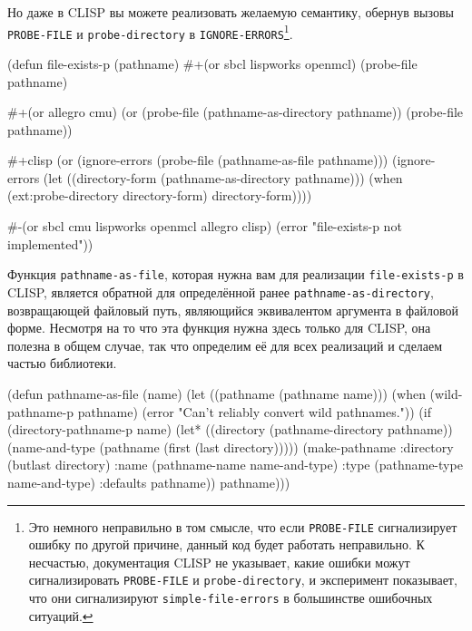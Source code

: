 Но даже в CLISP вы можете реализовать желаемую семантику, обернув вызовы \lstinline{PROBE-FILE}
и \lstinline{probe-directory} в \lstinline{IGNORE-ERRORS}\footnote{Это немного неправильно в том
  смысле, что если \lstinline{PROBE-FILE} сигнализирует ошибку по другой причине, данный код
  будет работать неправильно. К несчастью, документация CLISP не указывает, какие ошибки
  можут сигнализировать \lstinline{PROBE-FILE} и \lstinline{probe-directory}, и эксперимент
  показывает, что они сигнализируют \lstinline{simple-file-errors} в большинстве ошибочных
  ситуаций.}.

\begin{myverb}
  (defun file-exists-p (pathname)
    #+(or sbcl lispworks openmcl)
    (probe-file pathname)

    #+(or allegro cmu)
    (or (probe-file (pathname-as-directory pathname))
        (probe-file pathname))

    #+clisp
    (or (ignore-errors
          (probe-file (pathname-as-file pathname)))
        (ignore-errors
          (let ((directory-form (pathname-as-directory pathname)))
            (when (ext:probe-directory directory-form)
              directory-form))))

    #-(or sbcl cmu lispworks openmcl allegro clisp)
    (error "file-exists-p not implemented"))
\end{myverb}

Функция \lstinline{pathname-as-file}, которая нужна вам для реализации \lstinline{file-exists-p} в
CLISP, является обратной для определённой ранее \lstinline{pathname-as-directory}, возвращающей
файловый путь, являющийся эквивалентом аргумента в файловой форме. Несмотря на то что эта
функция нужна здесь только для CLISP, она полезна в общем случае, так что определим её для
всех реализаций и сделаем частью библиотеки.

\begin{myverb}
  (defun pathname-as-file (name)
    (let ((pathname (pathname name)))
      (when (wild-pathname-p pathname)
        (error "Can't reliably convert wild pathnames."))
      (if (directory-pathname-p name)
        (let* ((directory (pathname-directory pathname))
               (name-and-type (pathname (first (last directory)))))
          (make-pathname
           :directory (butlast directory)
           :name (pathname-name name-and-type)
           :type (pathname-type name-and-type)
           :defaults pathname))
        pathname)))
\end{myverb}

